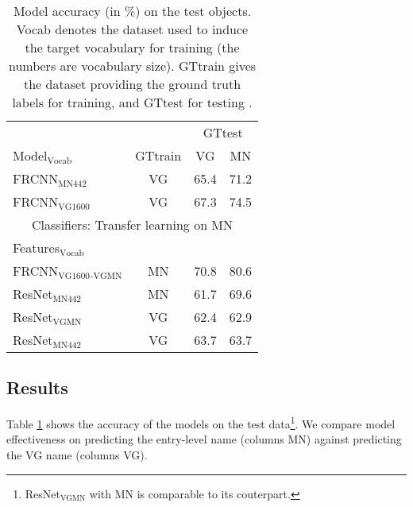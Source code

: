 \begin{table}[t]
	\centering
	\small
	\begin{tabular}{@{~}l@{~}|@{~}c@{~}|cc@{~}}
		\toprule
		&  & \multicolumn{2}{c}{GTtest} \\
		Model$_{\text{Vocab}}$ &  GTtrain &  VG & MN  \\ 
		\midrule
		FRCNN$_{\text{MN442}}$ & VG &  65.4 &      71.2   \\
		FRCNN$_{\text{VG1600}}$ & VG &    67.3 &      74.5 \\
		\midrule \midrule
		\multicolumn{4}{c}{Classifiers: Transfer learning on MN}\\
		Features$_{\text{Vocab}}$ &   \\
		\midrule 
		FRCNN$_{\text{VG1600}}$$_{\text{-VGMN}}$ & MN &    70.8 &      80.6  \\ 
		\midrule
		
		ResNet$_{\text{MN442}}$ & MN &            61.7 &              69.6  \\
		ResNet$_{\text{VGMN}}$  &   VG &  62.4 &              62.9  \\
		ResNet$_{\text{MN442}}$ & VG  &            63.7 &              63.7   \\
		\bottomrule
	\end{tabular}
	\caption{Model accuracy (in \%) on the \mn test objects. Vocab denotes the dataset used to induce the target vocabulary for training (the numbers are vocabulary size). GTtrain gives the dataset providing the ground truth labels for training, and GTtest for testing \label{tab:exp_VGvsMN}.}
\end{table}




\subsection{Results}
\label{sect:exp_results}

Table \ref{tab:exp_VGvsMN} shows the accuracy of the models on the \mn test data\footnote{ResNet$_{\text{VGMN}}$ with MN is comparable to its couterpart.}. 
We compare model effectiveness on predicting the entry-level name (columns MN) against predicting the VG name (columns VG). 

